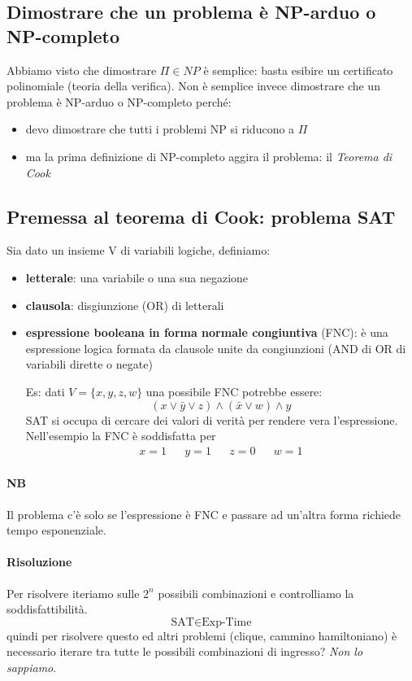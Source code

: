 \subsection{Dimostrare che un problema è NP-arduo o NP-completo} Abbiamo visto che dimostrare $\Pi \in NP$ è semplice: basta esibire un certificato polinomiale (teoria della verifica). Non è semplice invece dimostrare che un problema è NP-arduo o NP-completo perché:
\begin{itemize}
	\item devo dimostrare che tutti i problemi NP si riducono a $\Pi$
	\item ma la prima definizione di NP-completo aggira il problema: il \emph{Teorema di Cook}
\end{itemize}

\subsection{Premessa al teorema di Cook: problema SAT}
Sia dato un insieme V di variabili logiche, definiamo:
\begin{itemize}
	\item \textbf{letterale}: una variabile o una sua negazione
	\item \textbf{clausola}: disgiunzione (OR) di letterali
	\item \textbf{espressione booleana in forma normale congiuntiva} (FNC): è una espressione logica formata da clausole unite da congiunzioni (AND di OR di variabili dirette o negate)
	
	Es: dati $ V = \{x, y, z, w\}$ una possibile FNC potrebbe essere: 
	$$(x \lor \bar{y} \lor z) \land (\bar{x} \lor w) \land y$$
	SAT si occupa di cercare dei valori di verità per rendere vera l'espressione. Nell'esempio la FNC è soddisfatta per 
	\begin{align*}
		x=1&&y=1&&z=0&&w=1
	\end{align*}
\end{itemize}
\paragraph{NB} Il problema c'è solo se l'espressione è FNC e passare ad un'altra forma richiede tempo esponenziale.

\paragraph{Risoluzione} Per risolvere iteriamo sulle $2^n$ possibili combinazioni e controlliamo la soddisfattibilità.
$$ \text{SAT} \in \text{Exp-Time}$$
quindi per risolvere questo ed altri problemi (clique, cammino hamiltoniano) è necessario iterare tra tutte le possibili combinazioni di ingresso? \emph{Non lo sappiamo}.

